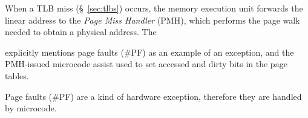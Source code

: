 
When a TLB miss (\S~\ref{sec:tlbs}) occurs, the memory execution unit forwards
the linear address to the \textit{Page Miss Handler} (PMH), which performs the
page walk needed to obtain a physical address. The


\cite{intel1999events} explicitly mentions
page faults (\#PF) as an example of an exception, and the PMH-issued microcode
assist used to set accessed and dirty bits in the page tables.

Page faults (\#PF) are a kind of hardware exception, therefore they are handled
by microcode.












